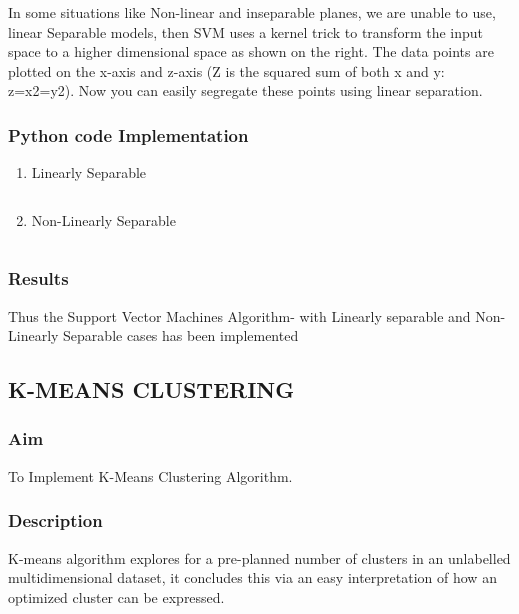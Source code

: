 \documentclass[12pt,a4paper]{article}
\begin{document}
\quad In some situations like Non-linear and inseparable planes, we are unable to use, linear Separable models, then SVM uses a kernel trick to transform the input space to a higher dimensional space as shown on the right. The data points are plotted on the x-axis and z-axis (Z is the squared sum of both x and y: z=x2=y2). Now you can easily segregate these points using linear separation. 

\subsubsection{Python code Implementation}
\begin{enumerate}
    \item Linearly Separable
        
        \inputminted[breaklines,breakafter=d,  style=perldoc]{python}{{./pythonFile/Q_viii_a.py}}
        
    \item Non-Linearly Separable
     
        \inputminted[breaklines,breakafter=d,  style=perldoc]{python}{{./pythonFile/Q_viii_b.py}}
        
\end{enumerate}



\subsubsection{Results}

\quad \quad Thus the Support Vector Machines Algorithm- with Linearly separable and Non- Linearly Separable cases has been implemented

\newpage

\subsection{K-MEANS CLUSTERING }

\subsubsection{Aim}
\quad \quad To Implement K-Means Clustering Algorithm.


\subsubsection{Description}

\quad \quad K-means algorithm explores for a pre-planned number of clusters in an unlabelled multidimensional dataset, it concludes this via an easy interpretation of how an optimized cluster can be expressed.
\end{document}
